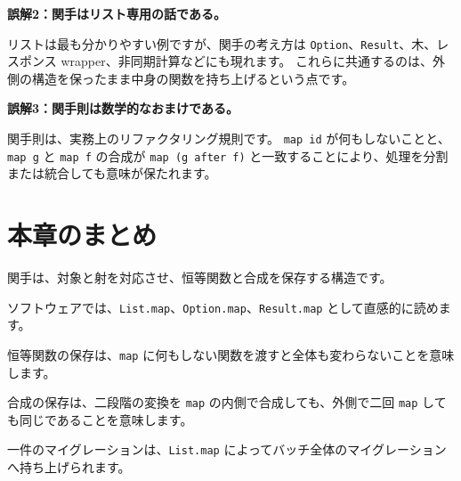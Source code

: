 \textbf{誤解2：関手はリスト専用の話である。}

リストは最も分かりやすい例ですが、関手の考え方は \texttt{Option}、\texttt{Result}、木、レスポンス wrapper、非同期計算などにも現れます。
これらに共通するのは、外側の構造を保ったまま中身の関数を持ち上げるという点です。

\textbf{誤解3：関手則は数学的なおまけである。}

関手則は、実務上のリファクタリング規則です。
\texttt{map id} が何もしないことと、\texttt{map g} と \texttt{map f} の合成が \texttt{map (g after f)} と一致することにより、処理を分割または統合しても意味が保たれます。

\section{本章のまとめ}

関手は、対象と射を対応させ、恒等関数と合成を保存する構造です。

ソフトウェアでは、\texttt{List.map}、\texttt{Option.map}、\texttt{Result.map} として直感的に読めます。

恒等関数の保存は、\texttt{map} に何もしない関数を渡すと全体も変わらないことを意味します。

合成の保存は、二段階の変換を \texttt{map} の内側で合成しても、外側で二回 \texttt{map} しても同じであることを意味します。

一件のマイグレーションは、\texttt{List.map} によってバッチ全体のマイグレーションへ持ち上げられます。
